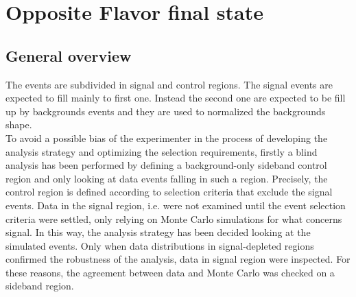 \newpage
\section{Opposite Flavor final state}\label{sec:OF}
\subsection*{General overview}

The events are subdivided in signal and control regions. The signal events are expected to fill  mainly to first one. Instead the second one are expected to be fill 
up by backgrounds events and they are used to normalized the backgrounds shape.\\
\newline
To avoid a possible bias of the experimenter in the process of developing the analysis
strategy and optimizing the selection requirements, firstly a blind analysis has been performed
by defining a background-only sideband control region and only looking at data events
falling in such a region. Precisely, the control region is defined according to  selection
criteria that exclude the signal events. 
Data in the signal region, i.e.  were not examined until the event selection
criteria were settled, only relying on Monte Carlo simulations for what concerns signal. 
In this way, the analysis strategy has been decided looking at the simulated events. 
Only when data distributions in signal-depleted regions confirmed the robustness of the analysis, data in
signal region were inspected. For these reasons, the agreement between data and Monte Carlo was
checked on a sideband region.




